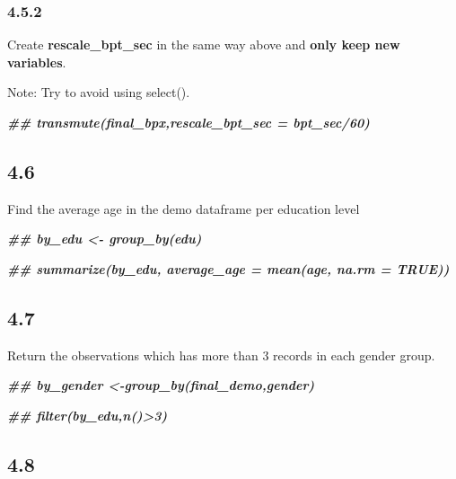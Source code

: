 \documentclass[
]{book}
\newenvironment{Shaded}{\begin{snugshade}}{\end{snugshade}}
\newcommand{\DocumentationTok}[1]{\textcolor[rgb]{0.56,0.35,0.01}{\textbf{\textit{#1}}}}
\begin{document}
\hypertarget{section-23}{%
\subsubsection{4.5.2}\label{section-23}}

Create \textbf{rescale\_bpt\_sec} in the same way above and \textbf{only keep new variables}.

Note: Try to avoid using select().

\begin{Shaded}
\begin{Highlighting}[]
\DocumentationTok{\#\#  transmute(final\_bpx,rescale\_bpt\_sec = bpt\_sec/60)}
\end{Highlighting}
\end{Shaded}

\hypertarget{section-24}{%
\subsection{4.6}\label{section-24}}

Find the average age in the demo dataframe per education level

\begin{Shaded}
\begin{Highlighting}[]
\DocumentationTok{\#\#  by\_edu \textless{}{-} group\_by(edu)}

\DocumentationTok{\#\# summarize(by\_edu, average\_age = mean(age, na.rm = TRUE))}
\end{Highlighting}
\end{Shaded}

\hypertarget{section-25}{%
\subsection{4.7}\label{section-25}}

Return the observations which has more than 3 records in each gender group.

\begin{Shaded}
\begin{Highlighting}[]
\DocumentationTok{\#\# by\_gender \textless{}{-}group\_by(final\_demo,gender)}

\DocumentationTok{\#\# filter(by\_edu,n()\textgreater{}3)}
\end{Highlighting}
\end{Shaded}

\hypertarget{section-26}{%
\subsection{4.8}\label{section-26}}
\end{document}
